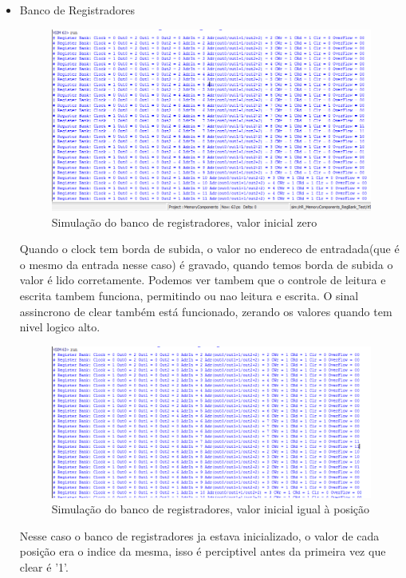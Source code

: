 \documentclass[a4paper, 10pt]{article}
\begin{document}
\begin{itemize}
	\item Banco de Registradores\\
	\begin{figure}[H]
		\centering
		\includegraphics[scale=0.6]{BANKsimu.PNG}
		\caption{Simulação do banco de registradores, valor inicial zero}
		\label{Rotulo}
	\end{figure}
	Quando o clock tem borda de subida, o valor no endereco de entradada(que é o mesmo da entrada nesse caso) é gravado, quando temos borda de subida o valor é lido corretamente. Podemos ver tambem que o controle de leitura e escrita tambem funciona, permitindo ou nao leitura e escrita. O sinal assincrono de clear também está funcionado, zerando os valores quando tem nivel logico alto.
	\begin{figure}[H]
		\centering
		\includegraphics[scale=0.6]{BANKsimu-startedvalues.PNG}
		\caption{Simulação do banco de registradores, valor inicial igual à posição}
		\label{Rotulo}
	\end{figure}
	Nesse caso o banco de registradores ja estava inicializado, o valor de cada posição era o indice da mesma, isso é perciptivel antes da primeira vez que clear é '1'.
	\vfill
	\begin{figure}[H]

\end{figure}
\end{itemize}
\end{document}
